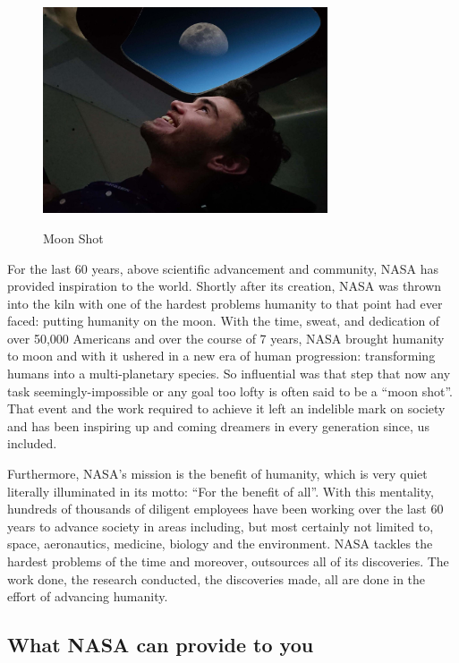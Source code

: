 \documentclass{article}
\let\Oldsubsection\subsection
\renewcommand{\subsection}{\FloatBarrier\Oldsubsection}
\begin{document}
\begin{figure}[!htb]
  \centering
  \caption{Moon Shot}
  \includegraphics[width=0.75\textwidth]{assets/smilingatthemoon.jpg}
  \label{fig:smilingatthemoon}
\end{figure}

For the last 60 years, above scientific advancement and community, NASA has provided inspiration to the world. Shortly after its creation, NASA was thrown into the kiln with one of the hardest problems humanity to that point had ever faced: putting humanity on the moon. With the time, sweat, and dedication of over 50,000 Americans and over the course of 7 years, NASA brought humanity to moon and with it ushered in a new era of human progression: transforming humans into a multi-planetary species. So influential was that step that now any task seemingly-impossible or any goal too lofty is often said to be a “moon shot”. That event and the work required to achieve it left an indelible mark on society and has been inspiring up and coming dreamers in every generation since, us included. 

Furthermore, NASA’s mission is the benefit of humanity, which is very quiet literally illuminated in its motto: “For the benefit of all”. With this mentality, hundreds of thousands of diligent employees have been working over the last 60 years to advance society in areas including, but most certainly not limited to, space, aeronautics, medicine, biology and the environment. NASA tackles the hardest problems of the time and moreover, outsources all of its discoveries. The work done, the research conducted, the discoveries made, all are done in the effort of advancing humanity.

\subsection{What NASA can provide to you}
\end{document}
